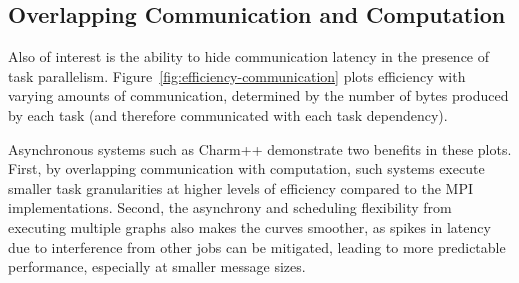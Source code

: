 


\subsection{Overlapping Communication and Computation}

Also of interest is the ability to
hide communication latency in the presence of task
parallelism. Figure~\ref{fig:efficiency-communication} plots efficiency with varying amounts of
communication, determined by the number
of bytes produced by each task (and therefore communicated with each
task dependency).

Asynchronous systems such as Charm++ demonstrate two benefits in
these plots. First, by overlapping communication with computation,
such systems execute smaller task granularities at higher
levels of efficiency compared to the MPI
implementations. Second, the asynchrony and scheduling flexibility from
executing multiple graphs also makes the curves smoother,
as spikes in latency due to interference from other jobs can be
mitigated, leading to more predictable performance, especially at
smaller message sizes.

